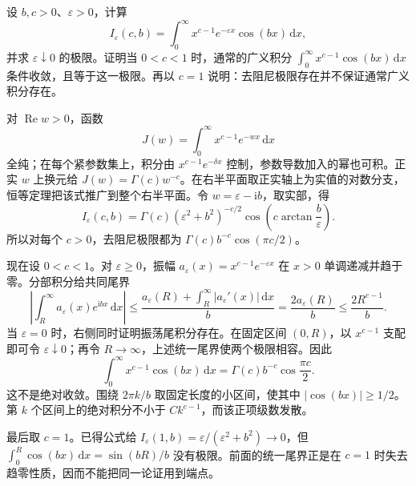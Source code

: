 \begin{exercise}[去阻尼与广义积分]\label{b3:ex:21-2}
设 \(b,c>0\)、\(\varepsilon>0\)，计算
\[
 I_\varepsilon(c,b)=\int_0^\infty
 x^{c-1}e^{-\varepsilon x}\cos(bx)\,\mathrm{d}x,
\]
并求 \(\varepsilon\downarrow0\) 的极限。证明当 \(0<c<1\) 时，通常的广义积分
\(\int_0^\infty x^{c-1}\cos(bx)\,\mathrm{d}x\) 条件收敛，且等于这一极限。再以 \(c=1\) 说明：去阻尼极限存在并不保证通常广义积分存在。
\end{exercise}
\begin{solution}
对 \(\operatorname{Re}w>0\)，函数
\[
 J(w)=\int_0^\infty x^{c-1}e^{-wx}\,\mathrm{d}x
\]
全纯；在每个紧参数集上，积分由 \(x^{c-1}e^{-\delta x}\) 控制，参数导数加入的幂也可积。正实 \(w\) 上换元给 \(J(w)=\Gamma(c)w^{-c}\)。在右半平面取正实轴上为实值的对数分支，恒等定理把该式推广到整个右半平面。令 \(w=\varepsilon-\mathrm{i}b\)，取实部，得
\[
 I_\varepsilon(c,b)
 =\Gamma(c)(\varepsilon^2+b^2)^{-c/2}
 \cos\left(c\arctan\frac b\varepsilon\right).
\]
所以对每个 \(c>0\)，去阻尼极限都为
\(\Gamma(c)b^{-c}\cos(\pi c/2)\)。

现在设 \(0<c<1\)。对 \(\varepsilon\ge0\)，振幅
\(a_\varepsilon(x)=x^{c-1}e^{-\varepsilon x}\) 在 \(x>0\) 单调递减并趋于零。分部积分给共同尾界
\[
 \left|\int_R^\infty a_\varepsilon(x)e^{\mathrm{i}bx}\,\mathrm{d}x\right|
 \le\frac{a_\varepsilon(R)+\int_R^\infty|a_\varepsilon'(x)|\,\mathrm{d}x}{b}
 =\frac{2a_\varepsilon(R)}b
 \le\frac{2R^{c-1}}b.
\]
当 \(\varepsilon=0\) 时，右侧同时证明振荡尾积分存在。在固定区间 \((0,R)\)，以 \(x^{c-1}\) 支配即可令 \(\varepsilon\downarrow0\)；再令 \(R\to\infty\)，上述统一尾界使两个极限相容。因此
\[
 \int_0^\infty x^{c-1}\cos(bx)\,\mathrm{d}x
 =\Gamma(c)b^{-c}\cos\frac{\pi c}2.
\]
这不是绝对收敛。围绕 \(2\pi k/b\) 取固定长度的小区间，使其中 \(|\cos(bx)|\ge1/2\)。第 \(k\) 个区间上的绝对积分不小于 \(Ck^{c-1}\)，而该正项级数发散。

最后取 \(c=1\)。已得公式给 \(I_\varepsilon(1,b)=\varepsilon/(\varepsilon^2+b^2)\to0\)，但
\(\int_0^R\cos(bx)\,\mathrm{d}x=\sin(bR)/b\) 没有极限。前面的统一尾界正是在 \(c=1\) 时失去趋零性质，因而不能把同一论证用到端点。
\end{solution}


